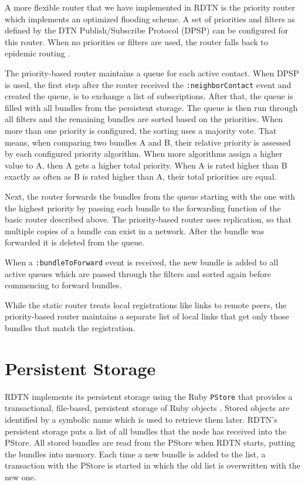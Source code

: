 \documentclass[a4paper]{article}
\begin{document}
A more flexible router that we have implemented in RDTN is the
priority router which implements an optimized flooding scheme. A set of
priorities and filters as defined by the DTN Publish/Subscribe Protocol (DPSP)
\cite{dtn-pubsub} can be configured for this router. When no priorities or
filters are used, the router falls back to epidemic routing \cite{epidemic}.


The priority-based router maintains a queue for each active contact. When DPSP
is used, the first step after the router received the {\tt :neighborContact}
event and created the queue, is to exchange a list of subscriptions.  After
that, the queue is filled with all bundles from the persistent storage. The
queue is then run through all filters and the remaining bundles are sorted based
on the priorities. When more than one priority is configured, the sorting uses a
majority vote. That means, when comparing two bundles A and B, their relative
priority is assessed by each configured priority algorithm. When more algorithms
assign a higher value to A, then A gets a higher total priority. When A is rated
higher than B exactly as often as B is rated higher than A, their total
priorities are equal.

Next, the router forwards the bundles from the queue starting with the one with
the highest priority by passing each bundle to the forwarding function of the
basic router described above. The priority-based router uses replication, so
that multiple copies of a bundle can exist in a network.  After the bundle was
forwarded it is deleted from the queue.

When a {\tt :bundleToForward} event is received, the new bundle is added to all
active queues which are passed through the filters and sorted again before
commencing to forward bundles.

While the static router treats local registrations like links to remote peers,
the priority-based router maintains a separate list of local links that get only
those bundles that match the registration.

\section{Persistent Storage}\label{sec.storage}

RDTN implements its persistent storage using the Ruby {\tt PStore} that provides
a transactional, file-based, persistent storage of Ruby objects \cite{pickaxe}.
Stored objects are identified by a symbolic name which is used to retrieve them
later. RDTN's persistent storage puts a list of all bundles that the node has
received into the PStore. All stored bundles are read from the PStore when RDTN
starts, putting the bundles into memory. Each time a new bundle is added to the
list, a transaction with the PStore is started in which the old list is
overwritten with the new one. 
\end{document}
